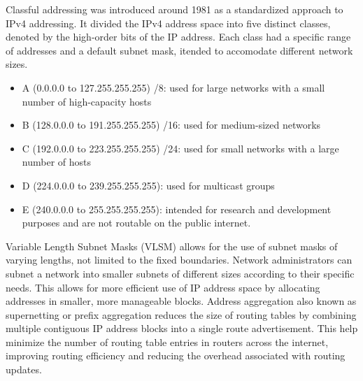 \documentclass{article}
\begin{document}
		Classful addressing was introduced around 1981 as a standardized approach to IPv4 addressing. It divided the IPv4 address space into five distinct classes, denoted by the high-order bits of the IP address. Each class had a specific range of addresses and a default subnet mask, itended to accomodate different network sizes.

\begin{itemize}	
\item A (0.0.0.0 to 127.255.255.255) /8: used for large networks with a small number of high-capacity hosts
\item B (128.0.0.0 to 191.255.255.255) /16: used for medium-sized networks
\item C (192.0.0.0 to 223.255.255.255) /24: used for small networks with a large number of hosts
\item D (224.0.0.0 to 239.255.255.255): used for multicast groups
\item E (240.0.0.0 to 255.255.255.255): intended for research and development purposes and are not routable on the public internet.
\end{itemize}
		
		Variable Length Subnet Masks (VLSM) allows for the use of subnet masks of varying lengths, not limited to the fixed boundaries. Network administrators can subnet a network into smaller subnets of different sizes according to their specific needs. This allows for more efficient use of IP address space by allocating addresses in smaller, more manageable blocks. Address aggregation also known as supernetting or prefix aggregation reduces the size of routing tables by combining multiple contiguous IP address blocks into a single route advertisement. This help minimize the number of routing table entries in routers across the internet, improving routing efficiency and reducing the overhead associated with routing updates.\\
\end{document}
